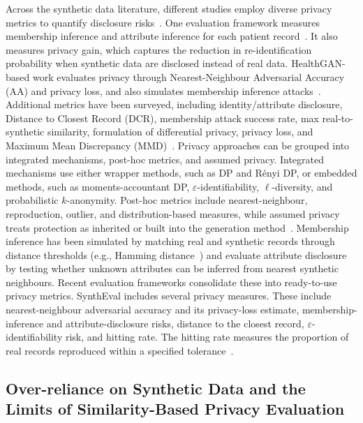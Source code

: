 Across the synthetic data literature, different studies employ diverse
privacy metrics to quantify disclosure risks~\cite{Murtaza2023}. One evaluation framework 
measures membership inference and attribute 
inference for each patient record~\cite{syninhospital}. It also measures privacy gain, which 
captures the reduction in re-identification probability when synthetic 
data are disclosed instead of real data. HealthGAN-based work evaluates privacy through
Nearest-Neighbour Adversarial Accuracy (AA) and privacy loss, and also
simulates membership inference attacks~\cite{yale2020synthesizing}.
Additional metrics have been surveyed, including
identity/attribute disclosure, Distance to Closest Record (DCR), membership
attack success rate, max real-to-synthetic similarity, formulation of
differential privacy, privacy loss, and Maximum Mean Discrepancy (MMD)~\cite{hernandez2022synthetic}.
Privacy approaches can be grouped into integrated mechanisms, post-hoc
metrics, and assumed privacy. Integrated mechanisms use either wrapper
methods, such as DP and Rényi DP, or embedded methods, such as
moments-accountant DP, $\varepsilon$-identifiability, $\ell$-diversity, and
probabilistic $k$-anonymity. Post-hoc metrics include nearest-neighbour,
reproduction, outlier, and distribution-based measures, while assumed
privacy treats protection as inherited or built into the generation
method~\cite{Murtaza2023}.
Membership inference has been simulated by matching real and
synthetic records through distance thresholds (e.g., Hamming
distance~\cite{goncalves2020generation}) and evaluate attribute disclosure by
testing whether unknown attributes can be inferred from nearest synthetic
neighbours. Recent evaluation frameworks consolidate these into ready-to-use
privacy metrics. SynthEval includes several privacy measures. These include
nearest-neighbour adversarial accuracy and its privacy-loss estimate,
membership-inference and attribute-disclosure risks, distance to the
closest record, $\varepsilon$-identifiability risk, and hitting rate. The
hitting rate measures the proportion of real records reproduced within a
specified tolerance~\cite{lautrup2025syntheval}.

\subsection{Over-reliance on Synthetic Data and the Limits of Similarity-Based Privacy Evaluation}
\label{sec:bg:eval:overreliance}


